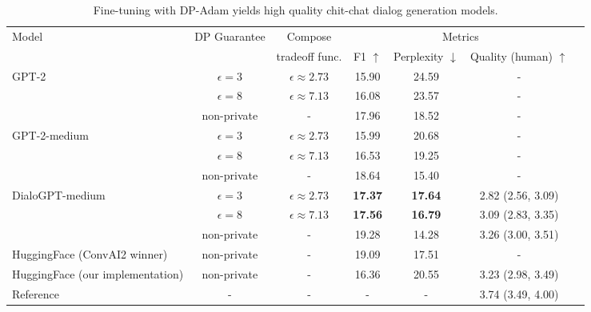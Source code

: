 \begin{table}[th]
\footnotesize
\setlength\tabcolsep{2pt}
\caption{
Fine-tuning with DP-Adam yields high quality chit-chat dialog generation models. 
}
\centering
\begin{tabular}{l c c c c c c}
\toprule
\multirow{2}[0]{*}{Model} & \multirow{2}[0]{*}{DP Guarantee} & Compose & \multicolumn{3}{c}{Metrics}  \\
 & & tradeoff func. & \scriptsize{F1} $\uparrow$  & \scriptsize{Perplexity} $\downarrow$ & \scriptsize{Quality (human)} $\uparrow$ \\
\midrule
\multirow{3}[1]{*}{GPT-2}
& $\epsilon=3$ & $\epsilon \approx 2.73$ & 15.90 & 24.59  & - \\
& $\epsilon=8$ & $\epsilon \approx 7.13$ & 16.08 & 23.57  & - \\
& non-private  & - & 17.96 & 18.52  & - \\
\midrule
\multirow{3}[1]{*}{GPT-2-medium}
& $\epsilon=3$ & $\epsilon \approx 2.73$ & 15.99 & 20.68  & - \\
& $\epsilon=8$ & $\epsilon \approx 7.13$ & 16.53 & 19.25  & - \\
& non-private &- & 18.64 & 15.40  & - \\
\midrule
\multirow{3}[1]{*}{DialoGPT-medium}
& $\epsilon=3$ & $\epsilon \approx 2.73$ & \textbf{17.37} & \textbf{17.64}  & 2.82 (2.56, 3.09)\\
& $\epsilon=8$ & $\epsilon \approx 7.13$ & \textbf{17.56} & \textbf{16.79}  & 3.09 (2.83, 3.35)\\
& non-private &- & 19.28 & 14.28  & 3.26 (3.00, 3.51)\\
\midrule
HuggingFace {\scriptsize (ConvAI2 winner)} & non-private &- & 19.09 & 17.51 & - \\
HuggingFace {\scriptsize (our implementation)} & non-private &- & 16.36 & 20.55 & 3.23 (2.98, 3.49) \\
\midrule
Reference &- &- &- &- & 3.74 (3.49, 4.00) \\
\bottomrule
\end{tabular}
\label{table:personachat}
\end{table}
